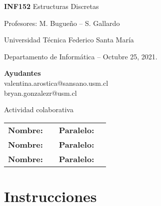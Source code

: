 \documentclass[letterpaper,10pt]{article}
\begin{document}
\begin{minipage}[t]{0.6\textwidth}
{\Large \textbf{INF152} Estructuras Discretas}

{\large Profesores: M. Bugueño -- S. Gallardo}

Universidad Técnica Federico Santa María

Departamento de Inform\'atica -- Octubre 25, 2021.

\end{minipage}
\hfill
\begin{minipage}[t]{0.35\textwidth}
\textbf{Ayudantes}\\
valentina.arostica@sansano.usm.cl\\
bryan.gonzalezr@usm.cl
\end{minipage}

\vspace{0.8cm}

\begin{center}
    \Huge{Actividad colaborativa}
\end{center}


\begin{table}[h]
    \begin{tabular}{llll}
         \textbf{Nombre:}&                   &\textbf{Paralelo:}&                     \\
         \textbf{Nombre:}&                   &\textbf{Paralelo:}&                     \\
         \textbf{Nombre:}&                   &\textbf{Paralelo:}&                     \\
    \end{tabular}
\end{table}



\section{Instrucciones}
\end{document}
